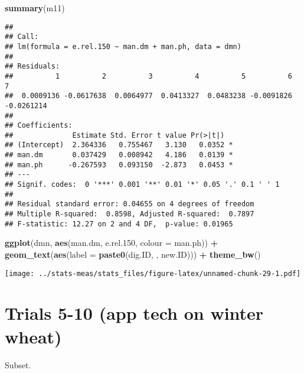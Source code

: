 \documentclass[
]{article}
\newenvironment{Shaded}{\begin{snugshade}}{\end{snugshade}}
\newcommand{\AttributeTok}[1]{\textcolor[rgb]{0.13,0.29,0.53}{#1}}
\newcommand{\FloatTok}[1]{\textcolor[rgb]{0.00,0.00,0.81}{#1}}
\newcommand{\FunctionTok}[1]{\textcolor[rgb]{0.13,0.29,0.53}{\textbf{#1}}}
\newcommand{\NormalTok}[1]{#1}
\newcommand{\SpecialCharTok}[1]{\textcolor[rgb]{0.81,0.36,0.00}{\textbf{#1}}}
\newcommand{\StringTok}[1]{\textcolor[rgb]{0.31,0.60,0.02}{#1}}
\begin{document}
\begin{Shaded}
\begin{Highlighting}[]
\FunctionTok{summary}\NormalTok{(m11)}
\end{Highlighting}
\end{Shaded}

\begin{verbatim}
## 
## Call:
## lm(formula = e.rel.150 ~ man.dm + man.ph, data = dmn)
## 
## Residuals:
##          1          2          3          4          5          6          7 
##  0.0009136 -0.0617638  0.0064977  0.0413327  0.0483238 -0.0091826 -0.0261214 
## 
## Coefficients:
##              Estimate Std. Error t value Pr(>|t|)  
## (Intercept)  2.364336   0.755467   3.130   0.0352 *
## man.dm       0.037429   0.008942   4.186   0.0139 *
## man.ph      -0.267593   0.093150  -2.873   0.0453 *
## ---
## Signif. codes:  0 '***' 0.001 '**' 0.01 '*' 0.05 '.' 0.1 ' ' 1
## 
## Residual standard error: 0.04655 on 4 degrees of freedom
## Multiple R-squared:  0.8598, Adjusted R-squared:  0.7897 
## F-statistic: 12.27 on 2 and 4 DF,  p-value: 0.01965
\end{verbatim}

\begin{Shaded}
\begin{Highlighting}[]
\FunctionTok{ggplot}\NormalTok{(dmn, }\FunctionTok{aes}\NormalTok{(man.dm, e.rel}\FloatTok{.150}\NormalTok{, }\AttributeTok{colour =}\NormalTok{ man.ph)) }\SpecialCharTok{+}
  \FunctionTok{geom\_text}\NormalTok{(}\FunctionTok{aes}\NormalTok{(}\AttributeTok{label =} \FunctionTok{paste0}\NormalTok{(dig.ID, }\StringTok{\textquotesingle{}{-}\textquotesingle{}}\NormalTok{, new.ID))) }\SpecialCharTok{+}
  \FunctionTok{theme\_bw}\NormalTok{()}
\end{Highlighting}
\end{Shaded}

\texttt{[image: ../stats-meas/stats\_files/figure-latex/unnamed-chunk-29-1.pdf]}

\section{Trials 5-10 (app tech on winter
wheat)}\label{trials-5-10-app-tech-on-winter-wheat}

Subset.
\end{document}
